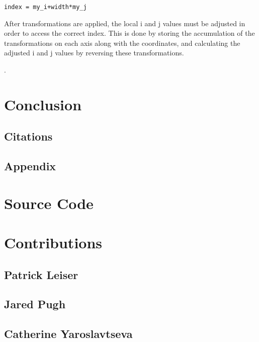 \documentclass{article}
\begin{document}
\begin{verbatim}
index = my_i+width*my_j
\end{verbatim}

After transformations are applied, the local i and j values must be adjusted in order to access the correct index. This is done by storing the accumulation of the transformations on each axis along with the coordinates, and calculating the adjusted i and j values by reversing these transformations. 

.

\section{Conclusion}

\begin{center}

\section*{Citations}

\end{center}

\begin{center}

\section*{Appendix}

\end{center}

\appendix

\section{Source Code}

\section{Contributions}

\subsection{Patrick Leiser}

\subsection{Jared Pugh}

\subsection{Catherine Yaroslavtseva}
\end{document}
